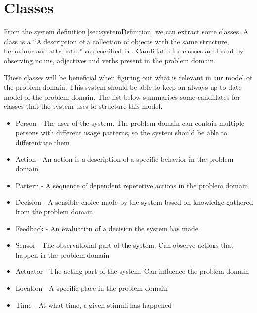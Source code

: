 \section{Classes}
From the system definition \cref{sec:systemDefinition} we can extract some classes. A class is a \enquote{A description of a collection of objects with the same structure, behaviour and attributes} as described in \cite{OOAD}. Candidates for classes are found by observing nouns, adjectives and verbs present in the problem domain.

These classes will be beneficial when figuring out what is relevant in our model of the problem domain. This system should be able to keep an always up to date model of the problem domain. The list below summarises some candidates for classes that the system uses to structure this model.

\begin{itemize}
\item Person - The user of the system. The problem domain can contain multiple persons with different usage patterns, so the system should be able to differentiate them
\item Action - An action is a description of a specific behavior in the problem domain
\item Pattern - A sequence of dependent repetetive actions in the problem domain
\item Decision - A sensible choice made by the system based on knowledge gathered from the problem domain
\item Feedback - An evaluation of a decision the system has made
\item Sensor - The observational part of the system. Can observe actions that happen in the problem domain
\item Actuator - The acting part of the system. Can influence the problem domain
\item Location - A specific place in the problem domain
\item Time - At what time, a given stimuli has happened
\end{itemize}

